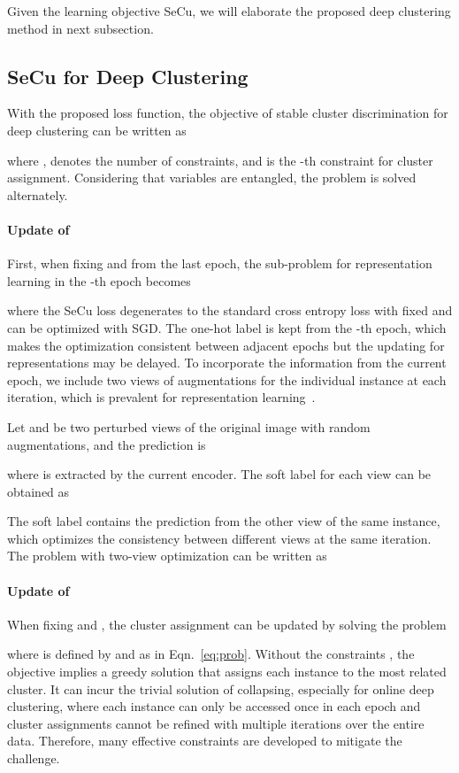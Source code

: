 \documentclass[10pt,twocolumn,letterpaper]{article}
\begin{document}
Given the learning objective SeCu, we will elaborate the proposed deep clustering method in next subsection.

\subsection{SeCu for Deep Clustering}
With the proposed loss function, the objective of stable cluster discrimination for deep clustering can be written as

where ,  denotes the number of constraints, and  is the -th constraint for cluster assignment. Considering that variables are entangled, the problem is solved alternately.

\paragraph{Update of }
First, when fixing  and  from the last epoch, the sub-problem for representation learning in the -th epoch becomes

where the SeCu loss degenerates to the standard cross entropy loss with fixed  and can be optimized with SGD. The one-hot label  is kept from the -th epoch, which makes the optimization consistent between adjacent epochs but the updating for representations may be delayed. To incorporate the information from the current epoch, we include two views of augmentations for the individual instance at  each iteration, which is prevalent for representation learning~\cite{ChenK0H20,He0WXG20,coke}. 

Let  and  be two perturbed views of the original image with random augmentations, and the prediction is

where  is extracted by the current encoder. The soft label for each view can be obtained as~\cite{coke}

The soft label contains the prediction from the other view of the same instance, which optimizes the consistency between different views at the same iteration.
The problem with two-view optimization can be written as


\paragraph{Update of } 
When fixing  and , the cluster assignment can be updated by solving the problem

where  is defined by  and  as in Eqn.~\ref{eq:prob}.
Without the constraints , the objective implies a greedy solution that assigns each instance to the most related cluster. It can incur the trivial solution of collapsing, especially for online deep clustering, where each instance can only be accessed once in each epoch and cluster assignments cannot be refined with multiple iterations over the entire data. Therefore, many effective constraints are developed to mitigate the challenge. 
\end{document}
